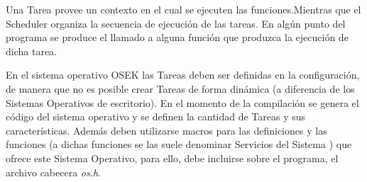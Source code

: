 \documentclass[12pt,letterpaper]{article}
\begin{document}
Una Tarea provee un contexto en el cual se ejecuten las funciones.Mientras que el Scheduler organiza la secuencia de ejecución de las tareas\cite{os223}.
En algún punto del programa se produce el llamado a alguna función que produzca la ejecución de dicha tarea\cite{librodertoseningles}.

En el sistema operativo OSEK las Tareas deben ser definidas en la configuración, de manera que no es posible crear Tareas de forma dinámica (a diferencia de los Sistemas Operativos de escritorio)\cite{libroosekcerdeiro}. En el momento de la compilación se genera el código del sistema operativo y se definen la cantidad de Tareas y sus características. Además deben utilizarse macros para las definiciones y las funciones (a dichas funciones se las suele denominar Servicios del Sistema ) que ofrece este Sistema Operativo, para ello, debe incluirse sobre el programa, el archivo cabecera \textit{os.h}.
\end{document}
